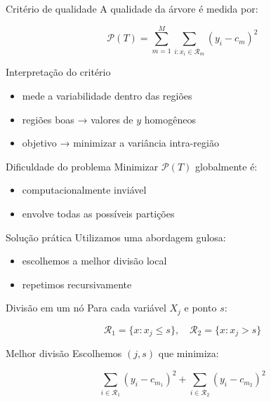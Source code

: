 \documentclass[
  ignorenonframetext,
  aspectratio=169,
]{beamer}
\providecommand{\tightlist}{%
  \setlength{\itemsep}{0pt}\setlength{\parskip}{0pt}}
\begin{document}
\begin{frame}
\begin{block}{Critério de qualidade}
\label{crituxe9rio-de-qualidade}
A qualidade da árvore é medida por:

\[
\mathcal{P}(T) =
\sum_{m=1}^M \sum_{i:x_i \in \mathcal{R}_m}
(y_i - c_m)^2
\]
\end{block}

\begin{block}{Interpretação do critério}
\label{interpretauxe7uxe3o-do-crituxe9rio}
\begin{itemize}
\tightlist
\item
  mede a variabilidade dentro das regiões\\
\item
  regiões boas → valores de \(y\) homogêneos\\
\item
  objetivo → minimizar a variância intra-região
\end{itemize}
\end{block}
\end{frame}

\begin{frame}
\begin{block}{Dificuldade do problema}
\label{dificuldade-do-problema}
Minimizar \(\mathcal{P}(T)\) globalmente é:

\begin{itemize}
\tightlist
\item
  computacionalmente inviável\\
\item
  envolve todas as possíveis partições
\end{itemize}
\end{block}

\begin{block}{Solução prática}
\label{soluuxe7uxe3o-pruxe1tica}
Utilizamos uma abordagem gulosa:

\begin{itemize}
\tightlist
\item
  escolhemos a melhor divisão local\\
\item
  repetimos recursivamente
\end{itemize}
\end{block}
\end{frame}

\begin{frame}
\begin{block}{Divisão em um nó}
\label{divisuxe3o-em-um-nuxf3}
Para cada variável \(X_j\) e ponto \(s\):

\[
\mathcal{R}_1 = \{x: x_j \leq s\}, \quad
\mathcal{R}_2 = \{x: x_j > s\}
\]
\end{block}

\begin{block}{Melhor divisão}
\label{melhor-divisuxe3o}
Escolhemos \((j,s)\) que minimiza:

\[
\sum_{i \in \mathcal{R}_1} (y_i - c_{m_1})^2 +
\sum_{i \in \mathcal{R}_2} (y_i - c_{m_2})^2
\]
\end{block}
\end{frame}
\end{document}
